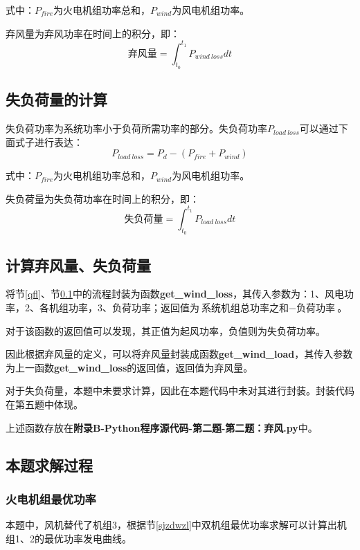 \documentclass{cumcmthesis}
\begin{document}
	式中：$ P_{fire} $为火电机组功率总和，$ P_{wind} $为风电机组功率。
	
	弃风量为弃风功率在时间上的积分，即：
	\begin{equation}\label{key}
		\texttt{弃风量}=\int_{t_{0}}^{t_{1}}P_{wind\ loss}\mathit{d}t
	\end{equation}
	
	\subsection{失负荷量的计算}\label{sfhl}
	失负荷功率为系统功率小于负荷所需功率的部分。失负荷功率$ P_{load\ loss} $可以通过下面式子进行表达：
	\begin{equation}\label{sfhleq}
		P_{load\ loss} =P_{d}-(P_{fire}+P_{wind})
	\end{equation}
	
	式中：$ P_{fire} $为火电机组功率总和，$ P_{wind} $为风电机组功率。
	
	失负荷量为失负荷功率在时间上的积分，即：
	\begin{equation}\label{key}
		\texttt{失负荷量}=\int_{t_{0}}^{t_{1}}P_{load\ loss}\mathit{d}t
	\end{equation}
	
\subsection{计算弃风量、失负荷量}\label{jsqflsfhl}
将节\ref{qfl}、节\ref{sfhl}中的流程封装为函数\textbf{get\_wind\_loss}，其传入参数为：1、风电功率，2、各机组功率，3、负荷功率；返回值为$ \texttt{系统机组总功率之和}-\texttt{负荷功率} $。

对于该函数的返回值可以发现，其正值为起风功率，负值则为失负荷功率。

因此根据弃风量的定义，可以将弃风量封装成函数\textbf{get\_wind\_load}，其传入参数为上一函数\textbf{get\_wind\_loss}的返回值，返回值为弃风量。

对于失负荷量，本题中未要求计算，因此在本题代码中未对其进行封装。封装代码在第五题中体现。	

上述函数存放在\textbf{附录B-Python程序源代码-第二题-第二题：弃风.py}中。
\subsection{本题求解过程}

	\subsubsection{火电机组最优功率}
	本题中，风机替代了机组3，根据节\ref{sjzdwzl}中双机组最优功率求解可以计算出机组1、2的最优功率发电曲线。
	
\end{document}
